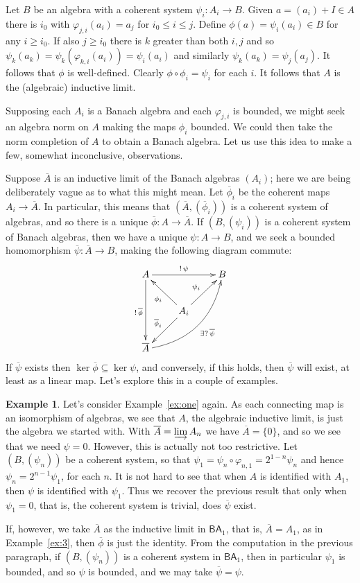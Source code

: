 \documentclass[a4paper,11pt]{article}
\newcommand{\indlim}{\varinjlim}
\newcommand{\ba}{\textsf{BA}}
\theoremstyle{definition}
\newtheorem{example}[lemma]{Example}
\begin{document}
Let $B$ be an algebra with a coherent system $\psi_i:A_i\rightarrow B$.  Given $a=(a_i)+I\in A$
there is $i_0$ with $\varphi_{j,i}(a_i) = a_j$ for $i_0\leq i\leq j$.  Define $\phi(a) =
\psi_i(a_i) \in B$ for any $i\geq i_0$.  If also $j\geq i_0$ there is $k$ greater than both $i,j$
and so $\psi_k(a_k) = \psi_k(\varphi_{k,i}(a_i)) = \psi_i(a_i)$ and similarly $\psi_k(a_k)
= \psi_j(a_j)$.  It follows that $\phi$ is well-defined.  Clearly $\phi\circ\phi_i = \psi_i$ for
each $i$.  It follows that $A$ is the (algebraic) inductive limit.

Supposing each $A_i$ is a Banach algebra and each $\varphi_{j,i}$ is bounded, we might seek an
algebra norm on $A$ making the maps $\phi_i$ bounded.  We could then take the norm completion of
$A$ to obtain a Banach algebra.  Let us use this idea to make a few, somewhat inconclusive,
observations.

Suppose $\overline{A}$ is an inductive limit of the Banach algebras $(A_i)$; here we are being
deliberately vague as to what this might mean.  Let $\overline\phi_i$ be the coherent maps
$A_i\rightarrow\overline A$.  In particular, this means that $(\overline A, (\overline\phi_i))$
is a coherent system of algebras, and so there is a unique $\overline\phi : A \rightarrow
\overline A$.  If $(B,(\psi_i))$ is a coherent system of Banach algebras, then we have a unique
$\psi:A\rightarrow B$, and we seek a bounded homomorphism $\overline\psi:\overline A\rightarrow B$,
making the following diagram commute:
\[ \xymatrix{ A \ar[rr]^{!\,\psi} \ar[dd]_{!\,\overline\phi} && B \\
& A_i \ar[lu]^{\phi_i} \ar[ru]^{\psi_i} \ar[ld]_{\overline\phi_i} \\
\overline A \ar@/_20pt/[rruu]_{\exists ?\,\overline\psi}
 } \]
If $\overline\psi$ exists then $\ker\overline\phi \subseteq \ker\psi$, and conversely, if this
holds, then $\overline\psi$ will exist, at least as a linear map.  Let's explore this in a couple
of examples.

\begin{example}
Let's consider Example~\ref{ex:one} again.  As each connecting map is an isomorphism of algebras, we
see that $A$, the algebraic inductive limit, is just the algebra we started with.  With $\overline A
= \indlim A_n$ we have $\overline A = \{0\}$, and so we see that we need $\psi=0$.  However, this is
actually not too restrictive.  Let $(B,(\psi_n))$ be a coherent system, so that $\psi_1 =
\psi_n \circ \varphi_{n,1} = 2^{1-n} \psi_n$ and hence $\psi_n = 2^{n-1} \psi_1$, for each $n$.
It is not hard to see that when $A$ is identified with $A_1$, then $\psi$ is identified with
$\psi_1$.  Thus we recover the previous result that only when $\psi_1=0$, that is, the coherent
system is trivial, does $\overline\psi$ exist.

If, however, we take $\overline A$ as the inductive limit in $\ba_1$, that is, $\overline A
= A_1$, as in Example~\ref{ex:3}, then $\overline\phi$ is just the identity.  From the computation
in the previous paragraph, if $(B,(\psi_n))$ is a coherent system in $\ba_1$, then in particular
$\psi_1$ is bounded, and so $\psi$ is bounded, and we may take $\overline\psi = \psi$.
\end{example}
\end{document}
